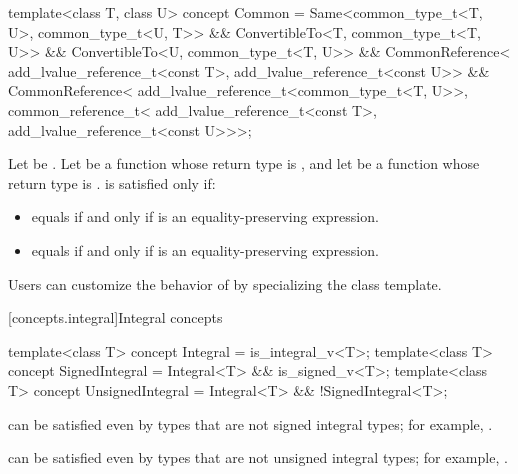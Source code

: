%
\begin{itemdecl}
template<class T, class U>
  concept Common =
    Same<common_type_t<T, U>, common_type_t<U, T>> &&
    ConvertibleTo<T, common_type_t<T, U>> &&
    ConvertibleTo<U, common_type_t<T, U>> &&
    CommonReference<
      add_lvalue_reference_t<const T>,
      add_lvalue_reference_t<const U>> &&
    CommonReference<
      add_lvalue_reference_t<common_type_t<T, U>>,
      common_reference_t<
        add_lvalue_reference_t<const T>,
        add_lvalue_reference_t<const U>>>;
\end{itemdecl}

\begin{itemdescr}
\pnum
Let  be . Let
 be a function whose return type is , and let  be a
function whose return type is .  is
satisfied only if:
\begin{itemize}
\item {} equals  if and only if
   is an equality-preserving
  expression.
\item {} equals  if and only if
   is an equality-preserving
  expression.
\end{itemize}

\pnum
\begin{note}
Users can customize the behavior of  by specializing the
 class template.
\end{note}

\end{itemdescr}

[concepts.integral]{Integral concepts}

%
%
%
\begin{itemdecl}
template<class T>
  concept Integral = is_integral_v<T>;
template<class T>
  concept SignedIntegral = Integral<T> && is_signed_v<T>;
template<class T>
  concept UnsignedIntegral = Integral<T> && !SignedIntegral<T>;
\end{itemdecl}

\begin{itemdescr}
\pnum
\begin{note}
 can be satisfied even by types that are
not signed integral types; for example, .
\end{note}

\pnum
\begin{note}
 can be satisfied even by types that are
not unsigned integral types; for example, .
\end{note}
\end{itemdescr}

